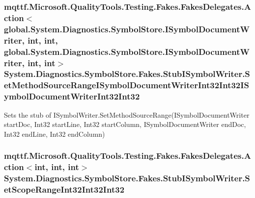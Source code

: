 \hypertarget{class_system_1_1_diagnostics_1_1_symbol_store_1_1_fakes_1_1_stub_i_symbol_writer_a45f98c193812e6401fb350b7889da754}{
\subsubsection[{Set\-Method\-Source\-Range\-I\-Symbol\-Document\-Writer\-Int32\-Int32\-I\-Symbol\-Document\-Writer\-Int32\-Int32}]{\setlength{\rightskip}{0pt plus 5cm}mqttf.\-Microsoft.\-Quality\-Tools.\-Testing.\-Fakes.\-Fakes\-Delegates.\-Action$<$global.\-System.\-Diagnostics.\-Symbol\-Store.\-I\-Symbol\-Document\-Writer, int, int, global.\-System.\-Diagnostics.\-Symbol\-Store.\-I\-Symbol\-Document\-Writer, int, int$>$ System.\-Diagnostics.\-Symbol\-Store.\-Fakes.\-Stub\-I\-Symbol\-Writer.\-Set\-Method\-Source\-Range\-I\-Symbol\-Document\-Writer\-Int32\-Int32\-I\-Symbol\-Document\-Writer\-Int32\-Int32}}\label{class_system_1_1_diagnostics_1_1_symbol_store_1_1_fakes_1_1_stub_i_symbol_writer_a45f98c193812e6401fb350b7889da754}


Sets the stub of I\-Symbol\-Writer.\-Set\-Method\-Source\-Range(\-I\-Symbol\-Document\-Writer start\-Doc, Int32 start\-Line, Int32 start\-Column, I\-Symbol\-Document\-Writer end\-Doc, Int32 end\-Line, Int32 end\-Column)

\hypertarget{class_system_1_1_diagnostics_1_1_symbol_store_1_1_fakes_1_1_stub_i_symbol_writer_aac63970832168a1dd7e585a712955d52}{
\subsubsection[{Set\-Scope\-Range\-Int32\-Int32\-Int32}]{\setlength{\rightskip}{0pt plus 5cm}mqttf.\-Microsoft.\-Quality\-Tools.\-Testing.\-Fakes.\-Fakes\-Delegates.\-Action$<$int, int, int$>$ System.\-Diagnostics.\-Symbol\-Store.\-Fakes.\-Stub\-I\-Symbol\-Writer.\-Set\-Scope\-Range\-Int32\-Int32\-Int32}}\label{class_system_1_1_diagnostics_1_1_symbol_store_1_1_fakes_1_1_stub_i_symbol_writer_aac63970832168a1dd7e585a712955d52}


